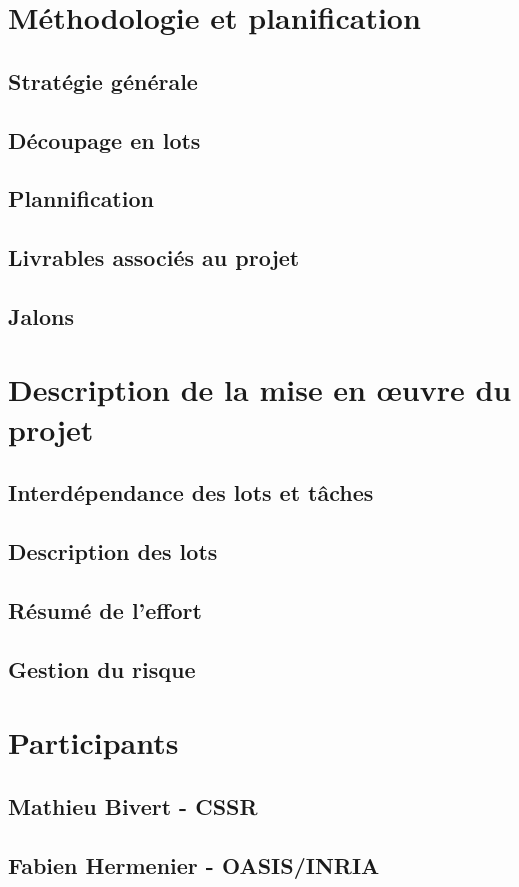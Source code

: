 \documentclass[a4paper]{article}
\begin{document}
\section{Méthodologie et planification}
\subsection{Stratégie générale}
\subsection{Découpage en lots}
\subsection{Plannification}
\subsection{Livrables associés au projet}
\subsection{Jalons}

\section{Description de la mise en œuvre du projet}
\subsection{Interdépendance des lots et t\^aches}
\subsection{Description des lots}
\subsection{Résumé de l'effort}
\subsection{Gestion du risque}

\section{Participants}
\subsection{Mathieu Bivert - CSSR}
\subsection{Fabien Hermenier - OASIS/INRIA}

\newpage


\end{document}
